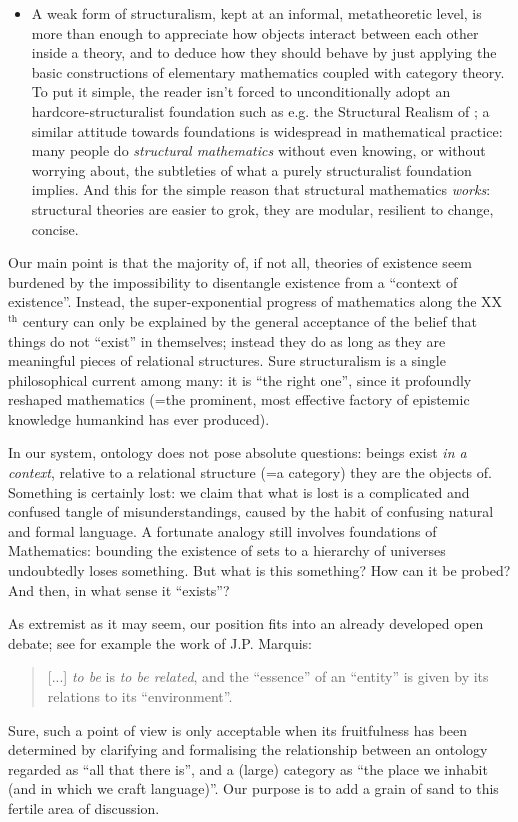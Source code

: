 \begin{itemize}
	\item A weak form of structuralism, kept at an informal, metatheoretic level, is more than enough to appreciate how objects interact between each other inside a theory, and to deduce how they should behave by just applying the basic constructions of elementary mathematics coupled with category theory. To put it simple, the reader isn't forced to unconditionally adopt an hardcore-structuralist foundation such as e.g. the Structural Realism of \cite{bain2013category,eva2016category}; a similar attitude towards foundations is widespread in mathematical practice: many people do \textit{structural mathematics} without even knowing, or without worrying about, the subtleties of what a purely structuralist foundation implies. And this for the simple reason that structural mathematics \emph{works}: structural theories are easier to grok, they are modular, resilient to change, concise.
\end{itemize}
Our main point is that the majority of, if not all, theories of existence seem burdened by the impossibility to disentangle existence from a ``context of existence''. Instead, the super-exponential progress of mathematics along the XX$^\text{th}$ century can only be explained by the general acceptance of the belief that things do not ``exist'' in themselves; instead they do as long as they are meaningful pieces of relational structures. Sure structuralism is a single philosophical current among many: it is ``the right one'', since it profoundly reshaped mathematics (=the prominent, most effective factory of epistemic knowledge humankind has ever produced).

In our system, ontology does not pose absolute questions: beings exist \emph{in a context}, relative to a relational structure (=a category) they are the objects of. Something is certainly lost: we claim that what is lost is a complicated and confused tangle of misunderstandings, caused by the habit of confusing natural and formal language. A fortunate analogy still involves foundations of Mathematics: bounding the existence of sets to a hierarchy of universes undoubtedly loses something. But what is this something? How can it be probed? And then, in what sense it ``exists''?

As extremist as it may seem, our position fits into an already developed open debate; see for example the work of J.P. Marquis:
\begin{quote}
	[...] \emph{to be} is \emph{to be related}, and the ``essence'' of an ``entity'' is given by its relations to its ``environment''.
	\hfill \cite{Marquis1997}
\end{quote}
Sure, such a point of view is only acceptable when its fruitfulness has been determined by clarifying and formalising the relationship between an ontology regarded as ``all that there is'', and a (large) category as ``the place we inhabit (and in which we craft language)''. Our purpose is to add a grain of sand to this fertile area of discussion.

